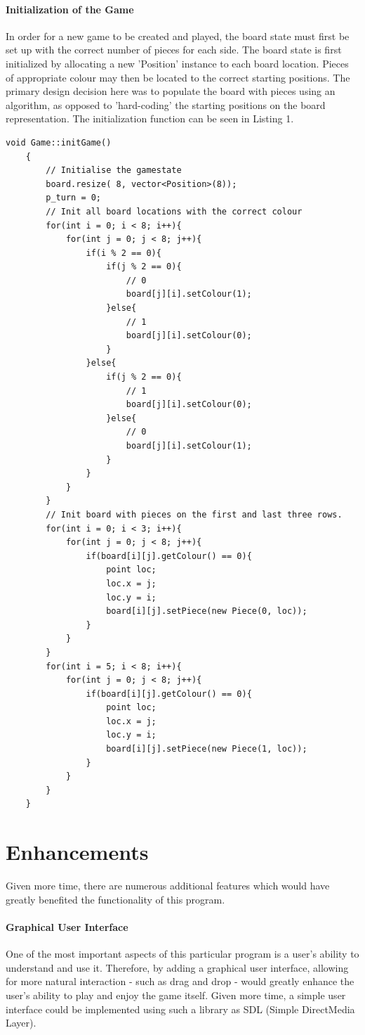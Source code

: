 \documentclass[10pt, a4paper]{article}
\begin{document}
	\paragraph{Initialization of the Game}
	In order for a new game to be created and played, the board state must first be set up with the correct number of pieces for each side. The board state is first initialized by allocating a new 'Position' instance to each board location. Pieces of appropriate colour may then be located to the correct starting positions. The primary design decision here was to populate the board with pieces using an algorithm, as opposed to 'hard-coding' the starting positions on the board representation. 
	The initialization function can be seen in Listing 1.
	\newpage
	\begin{lstlisting}[caption = Game Initialization - C++]
    void Game::initGame()
    {
    	// Initialise the gamestate
    	board.resize( 8, vector<Position>(8));
    	p_turn = 0;
    	// Init all board locations with the correct colour
    	for(int i = 0; i < 8; i++){
    		for(int j = 0; j < 8; j++){
    			if(i % 2 == 0){
    				if(j % 2 == 0){
    					// 0
    					board[j][i].setColour(1);
    				}else{
    					// 1
    					board[j][i].setColour(0);
    				}
    			}else{
    				if(j % 2 == 0){
    					// 1
    					board[j][i].setColour(0);
    				}else{
    					// 0
    					board[j][i].setColour(1);
    				}
    			}	
    		}
    	}
    	// Init board with pieces on the first and last three rows.
    	for(int i = 0; i < 3; i++){
    		for(int j = 0; j < 8; j++){
    			if(board[i][j].getColour() == 0){
    				point loc;
    				loc.x = j;
    				loc.y = i;
    				board[i][j].setPiece(new Piece(0, loc));
    			}
    		}
    	}
    	for(int i = 5; i < 8; i++){
    		for(int j = 0; j < 8; j++){
    			if(board[i][j].getColour() == 0){
    				point loc;
    				loc.x = j;
    				loc.y = i;
    				board[i][j].setPiece(new Piece(1, loc));
    			}
    		}
    	}
    }
	\end{lstlisting}
	
	\section{Enhancements}
	Given more time, there are numerous additional features which would have greatly benefited the functionality of this program.
	\paragraph{Graphical User Interface}
	One of the most important aspects of this particular program is a user's ability to understand and use it. Therefore, by adding a graphical user interface, allowing for more natural interaction - such as drag and drop - would greatly enhance the user's ability to play and enjoy the game itself. Given more time, a simple user interface could be implemented using such a library as SDL (Simple DirectMedia Layer)\cite{SDL}.
\end{document}
